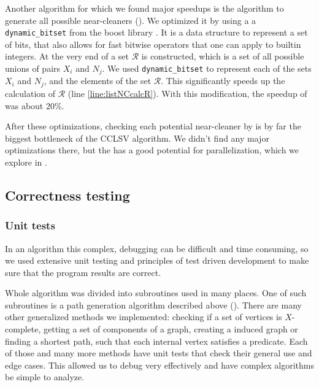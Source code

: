 
Another algorithm for which we found major speedups is the algorithm to generate all possible near-cleaners (). We optimized it by using a a \texttt{dynamic\_bitset} from the boost library \cite{boost}. It is a data structure to represent a set of bits, that also allows for fast bitwise operators that one can apply to builtin integers. At the very end of  a set $\mathcal{R}$ is constructed, which is a set of all possible unions of pairs $X_i$ and $N_j$. We used \texttt{dynamic\_bitset} to represent each of the sets $X_i$ and $N_j$, and the elements of the set $\mathcal{R}$. This significantly speeds up the calculation of $\mathcal{R}$ (line \ref{line:listNCcalcR}). With this modification, the speedup of  was about 20\%.

After these optimizations, checking each potential near-cleaner by  is by far the biggest bottleneck of the CCLSV algorithm. We didn't find any major optimizations there, but the  has a good potential for parallelization, which we explore in .

\subsection{Correctness testing}

\subsubsection{Unit tests}

In an algorithm this complex, debugging can be difficult and time consuming, so we used extensive unit testing and principles of test driven development to make sure that the program results are correct.

Whole algorithm was divided into subroutines used in many places. One of such subroutines is a path generation algorithm described above (). There are many other generalized methods we implemented: checking if a set of vertices is $X$-complete, getting a set of components of a graph, creating a induced graph or finding a shortest path, such that each internal vertex satisfies a predicate. Each of those and many more methods have unit tests that check their general use and edge cases. This allowed us to debug very effectively and have complex algorithms be simple to analyze.


